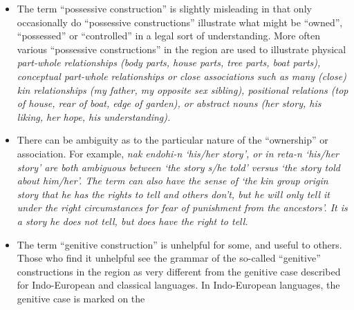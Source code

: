 \begin{itemize}
				inalienable possession, and proclitics to mark alienable possession,
				nevertheless when there is an explicit possessor it is pre-posed
				in both constructions (see ).
				However, with many Papuan languages of TAP
				and , the preposed possessor proclitics/prefixes
				are often the only possessor to be found.
				We also note that in natural texts in most languages,
				an explicit possessor is often omitted from possessive constructions
				because it is known from the discourse context.
				Sometimes explicit possessors are most commonly used in natural
				texts to disambiguate  from ,
				or  from ,
				depending on where ambiguity is found in a particular language.
	\item The term “possessive construction” is slightly misleading
				in that only occasionally do “possessive constructions” illustrate
				what might be “owned”,
				“possessed” or “controlled” in a legal sort of understanding.
				More often various ``possessive constructions'' in the region are
				used to illustrate physical \it{part-whole} relationships (body
				parts, house parts, tree parts,
				boat parts), conceptual part-whole relationships or close associations
				such as many (close) kin relationships (\it{my father,
				my opposite sex sibling}),
				positional relations (\it{top of house,
				rear of boat, edge of garden}),
				or abstract nouns (\it{her story,
				his liking, her hope, his understanding}).
	\item There can be ambiguity as to the particular nature of
				the ``ownership'' or association.
				For example,  \it{nak endohi-n} ‘his/her story’,
				or   \it{in reta-n} ‘his/her story’ are both ambiguous
				between ‘the story s/he told’ versus ‘the story told about him/her’.
				The  term can also have the sense of ‘the kin group origin
				story that he has the rights to tell
				and others don’t, but he will only tell it under the right circumstances
				for fear of punishment from the ancestors’.
				It is a story he does not tell,
				but does have the right to tell.
	\item The term “genitive construction” is unhelpful for
				some, and useful to others.
				Those who find it unhelpful see the grammar of the so-called
				“genitive” constructions in the region as very different
				from the genitive case described for Indo-European and classical languages.
				In Indo-European languages, the genitive case is marked on the

\end{itemize}
